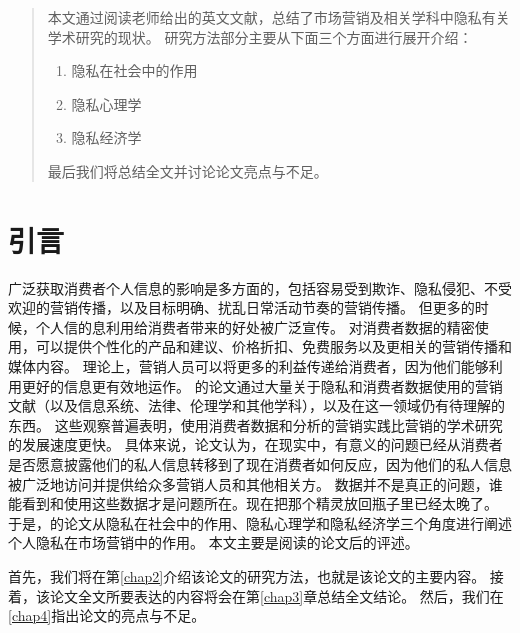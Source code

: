 \documentclass[degree=project,degree-type=project,cjk-font=windows]{thuthesis}
\begin{document}
\maketitle

\frontmatter
\begin{abstract}
  本文通过阅读老师给出的英文文献，总结了市场营销及相关学科中隐私有关学术研究的现状。
  研究方法部分主要从下面三个方面进行展开介绍：

  \begin{enumerate}
    \item 隐私在社会中的作用
    \item 隐私心理学
    \item 隐私经济学
  \end{enumerate}

  最后我们将总结全文并讨论论文亮点与不足。

\end{abstract}

\tableofcontents


\mainmatter

\chapter{引言}

广泛获取消费者个人信息的影响是多方面的，包括容易受到欺诈、隐私侵犯、不受欢迎的营销传播，以及目标明确、扰乱日常活动节奏的营销传播。
但更多的时候，个人信的息利用给消费者带来的好处被广泛宣传。
对消费者数据的精密使用，可以提供个性化的产品和建议、价格折扣、免费服务以及更相关的营销传播和媒体内容。
理论上，营销人员可以将更多的利益传递给消费者，因为他们能够利用更好的信息更有效地运作。
\cite{data_privacy}的论文通过大量关于隐私和消费者数据使用的营销文献（以及信息系统、法律、伦理学和其他学科），以及在这一领域仍有待理解的东西。
这些观察普遍表明，使用消费者数据和分析的营销实践比营销的学术研究的发展速度更快。
具体来说，论文认为，在现实中，有意义的问题已经从消费者是否愿意披露他们的私人信息转移到了现在消费者如何反应，因为他们的私人信息被广泛地访问并提供给众多营销人员和其他相关方。
数据并不是真正的问题，谁能看到和使用这些数据才是问题所在。现在把那个精灵放回瓶子里已经太晚了。
于是，\cite{data_privacy}的论文从隐私在社会中的作用、隐私心理学和隐私经济学三个角度进行阐述个人隐私在市场营销中的作用。
本文主要是阅读\cite{data_privacy}的论文后的评述。

首先，我们将在第\ref{chap2}介绍该论文的研究方法，也就是该论文的主要内容。
接着，该论文全文所要表达的内容将会在第\ref{chap3}章总结全文结论。
然后，我们在\ref{chap4}指出论文的亮点与不足。
\end{document}
